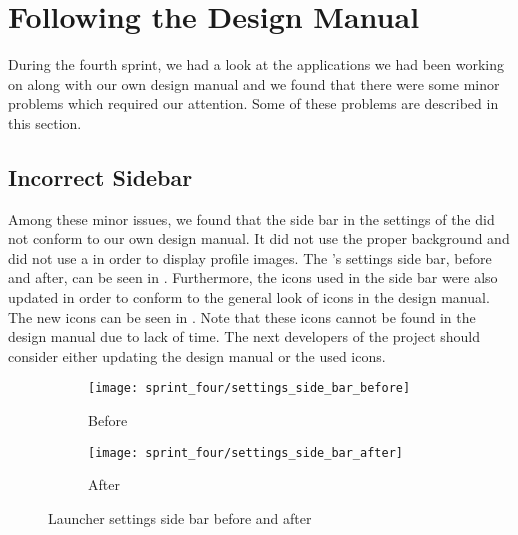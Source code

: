 
\section{Following the Design Manual}
\label{sec:following_design_guides}
During the fourth sprint, we had a look at the applications we had been working on along with our own design manual and we found that there were some minor problems which required our attention. Some of these problems are described in this section.

\subsection{Incorrect Sidebar}
\label{sec:wrong_sidebar}
Among these minor issues, we found that the side bar in the settings of the \launcher did not conform to our own design manual. It did not use the proper background and did not use a  in order to display profile images. The \launcher's settings side bar, before and after, can be seen in . Furthermore, the icons used in the side bar were also updated in order to conform to the general look of icons in the design manual. The new icons can be seen in . Note that these icons cannot be found in the design manual due to lack of time. The next developers of the project should consider either updating the design manual or the used icons.

\begin{figure}[!htbp]
    \centering

    \begin{subfigure}[t]{0.3\textwidth}
        \texttt{[image: sprint\_four/settings\_side\_bar\_before]}
        \caption{Before}
        \label{fig:launcher_settings_side_bar_before}
    \end{subfigure}
    \hspace{5em} 
    \begin{subfigure}[t]{0.3\textwidth}
        \texttt{[image: sprint\_four/settings\_side\_bar\_after]}
        \caption{After}
        \label{fig:launcher_settings_side_bar_after}
    \end{subfigure}
    
    \caption{Launcher settings side bar before and after}
    \label{fig:launcher_settings_side_bar_before_and_after}
\end{figure}


